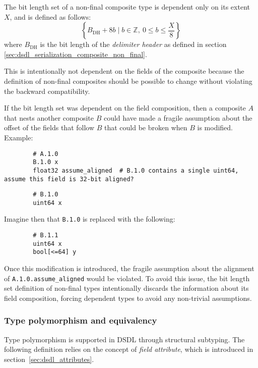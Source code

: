 The bit length set of a non-final composite type is dependent only on its extent $X$, and is defined as follows:
$$
    \left\{ B_\text{DH} + 8b \mid b \in \mathbb{Z},\ 0 \leq b \leq \frac{X}{8} \right\}
$$
where $B_\text{DH}$ is the bit length of the \emph{delimiter header}
as defined in section \ref{sec:dsdl_serialization_composite_non_final}.

\begin{remark}
    This is intentionally not dependent on the fields of the composite because the definition of non-final
    composites should be possible to change without violating the backward compatibility.

    If the bit length set was dependent on the field composition, then a composite $A$ that nests another composite
    $B$ could have made a fragile assumption about the offset of the fields that follow $B$
    that could be broken when $B$ is modified. Example:

    \begin{verbatim}
        # A.1.0
        B.1.0 x
        float32 assume_aligned  # B.1.0 contains a single uint64, assume this field is 32-bit aligned?
    \end{verbatim}

    \begin{verbatim}
        # B.1.0
        uint64 x
    \end{verbatim}

    Imagine then that \verb|B.1.0| is replaced with the following:

    \begin{verbatim}
        # B.1.1
        uint64 x
        bool[<=64] y
    \end{verbatim}

    Once this modification is introduced, the fragile assumption about the alignment of
    \verb|A.1.0.assume_aligned| would be violated.
    To avoid this issue, the bit length set definition of non-final types intentionally discards the information
    about its field composition, forcing dependent types to avoid any non-trivial assumptions.
\end{remark}

\subsubsection{Type polymorphism and equivalency}

Type polymorphism is supported in DSDL through structural subtyping.
The following definition relies on the concept of \emph{field attribute},
which is introduced in section~\ref{sec:dsdl_attributes}.

